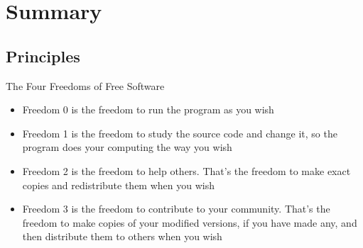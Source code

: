 \section{Summary}\frame{\sectionpage}

\subsection{Principles}
\begin{frame}{The Four Freedoms of Free Software}
  \begin{itemize}
    \item Freedom 0 is the freedom to run the program as you wish
    \item Freedom 1 is the freedom to study the source code and change it,
      so the program does your computing the way you wish
    \item Freedom 2 is the freedom to help others. That's the freedom to
      make exact copies and redistribute them when you wish
    \item Freedom 3 is the freedom to contribute to your community. That's
      the freedom to make copies of your modified versions, if you have made any,
      and then distribute them to others when you wish
  \end{itemize}
\end{frame}


